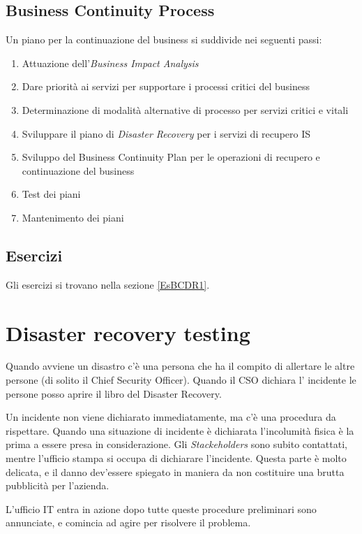\subsection{Business Continuity Process}

Un piano per la continuazione del business si suddivide nei seguenti passi:
\begin{enumerate}
  \item Attuazione dell'\textit{Business Impact Analysis}
  \item Dare priorità ai servizi per supportare i processi critici del business
  \item Determinazione di modalità alternative di processo per servizi critici
  e vitali
  \item Sviluppare il piano di \textit{Disaster Recovery} per i servizi di
  recupero IS
  \item Sviluppo del Business Continuity Plan per le operazioni di recupero e
  continuazione del business
  \item Test dei piani
  \item Mantenimento dei piani
\end{enumerate}

\subsection{Esercizi}

Gli esercizi si trovano nella sezione \ref{EsBCDR1}.

\section{Disaster recovery testing}

Quando avviene un disastro c'è una persona che ha il compito di allertare le
altre persone (di solito il Chief Security Officer). Quando il CSO dichiara l'
incidente le persone posso aprire il libro del Disaster Recovery.

Un incidente non viene dichiarato immediatamente, ma c'è una procedura da
rispettare. Quando una situazione di incidente è dichiarata l'incolumità fisica
è la prima a essere presa in considerazione. Gli \textit{Stackeholders} sono
subito contattati, mentre l'ufficio stampa si occupa di dichiarare l'incidente.
Questa parte è molto delicata, e il danno dev'essere spiegato in maniera da non
costituire una brutta pubblicità per l'azienda.

L'ufficio IT entra in azione dopo tutte queste procedure preliminari sono
annunciate, e comincia ad agire per risolvere il problema.

